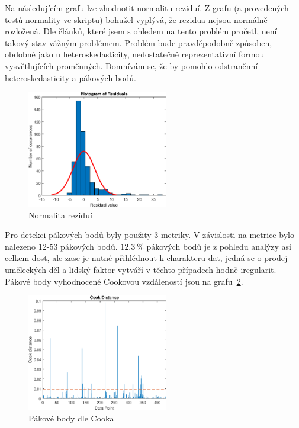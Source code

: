 Na následujícím grafu lze zhodnotit normalitu reziduí.
Z grafu (a provedených testů normality ve skriptu) bohužel vyplývá, že rezidua nejsou normálně rozložená.
Dle článků, které jsem s ohledem na tento problém pročetl, není takový stav vážným problémem.
Problém bude pravděpodobně způsoben, obdobně jako u heteroskedasticity, nedostatečně reprezentativní formou vysvětlujících proměnných.
Domnívám se, že by pomohlo odstraněnní heteroskedasticity a pákových bodů.

\begin{figure}[htb]
    \centering
    \includegraphics[width=0.55\textwidth]{graphs/fig3.eps}
    \caption{Normalita reziduí}
    \label{fig:lr3}
\end{figure}
\FloatBarrier

Pro detekci pákových bodů byly použity 3 metriky.
V závislosti na metrice bylo nalezeno 12-53 pákových bodů.
\( 12.3 \: \% \) pákových bodů je z pohledu analýzy asi celkem dost, ale zase je nutné přihlédnout k charakteru dat, jedná se o prodej uměleckých děl a lidský faktor vytváří v těchto případech hodně iregularit.
Pákové body vyhodnocené Cookovou vzdáleností jsou na grafu~\ref{fig:lr2}.

\begin{figure}[htb]
    \centering
    \includegraphics[width=0.55\textwidth]{graphs/fig2.eps}
    \caption{Pákové body dle Cooka}
    \label{fig:lr2}
\end{figure}
\FloatBarrier

